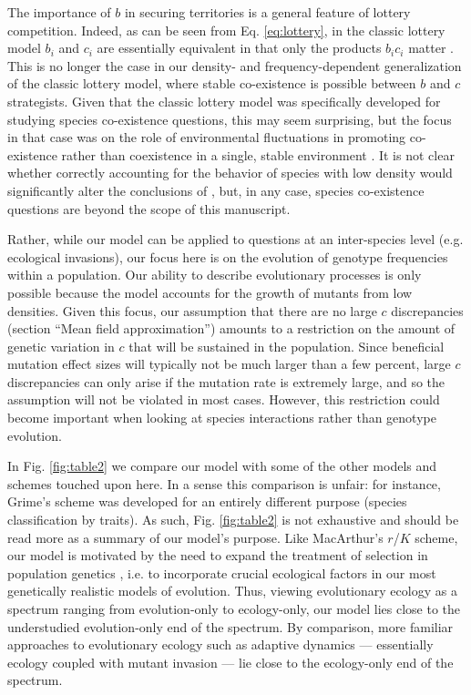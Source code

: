 \documentclass[11pt]{article}
\begin{document}
The importance of $b$ in securing territories is a general feature of lottery competition. Indeed, as can be seen from Eq. \eqref{eq:lottery}, in the classic lottery model $b_i$ and $c_i$ are essentially equivalent in that only the products $b_i c_i$ matter \citep{chesson_1981}. This is no longer the case in our density- and frequency-dependent generalization of the classic lottery model, where stable co-existence is possible between $b$ and $c$ strategists. Given that the classic lottery model was specifically developed for studying species co-existence questions, this may seem surprising, but the focus in that case was on the role of environmental fluctuations in promoting co-existence rather than coexistence in a single, stable environment \citep{chesson_1981}. It is not clear whether correctly accounting for the behavior of species with low density would significantly alter the conclusions of \cite{chesson_1981}, but, in any case, species co-existence questions are beyond the scope of this manuscript. 

Rather, while our model can be applied to questions at an inter-species level (e.g. ecological invasions), our focus here is on the evolution of genotype frequencies within a population. Our ability to describe evolutionary processes is only possible because the model accounts for the growth of mutants from low densities. Given this focus, our assumption that there are no large $c$ discrepancies (section ``Mean field approximation'') amounts to a restriction on the amount of genetic variation in $c$ that will be sustained in the population. Since beneficial mutation effect sizes will typically not be much larger than a few percent, large $c$ discrepancies can only arise if the mutation rate is extremely large, and so the assumption will not be violated in most cases. However, this restriction could become important when looking at species interactions rather than genotype evolution.

In Fig. \ref{fig:table2} we compare our model with some of the other models and schemes touched upon here. In a sense this comparison is unfair: for instance, Grime's scheme was developed for an entirely different purpose (species classification by traits). As such, Fig. \ref{fig:table2} is not exhaustive and should be read more as a summary of our model's purpose. Like MacArthur's $r$/$K$ scheme, our model is motivated by the need to expand the treatment of selection in population genetics \citep{macarthur_1962}, i.e. to incorporate crucial ecological factors in our most genetically realistic models of evolution. Thus, viewing evolutionary ecology \citep{kokko_2007,pelletier_2009,schoener_2011} as a spectrum ranging from evolution-only to ecology-only, our model lies close to the understudied evolution-only end of the spectrum. By comparison, more familiar approaches to evolutionary ecology such as adaptive dynamics --- essentially ecology coupled with mutant invasion \citep{diekmann_2004} ---  lie close to the ecology-only end of the spectrum. 
\end{document}

